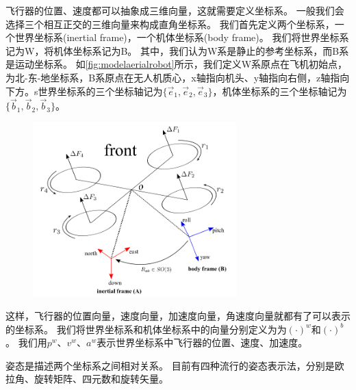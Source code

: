 \documentclass[
  type=master
]{gdutthesis}
\begin{document}
飞行器的位置、速度都可以抽象成三维向量，这就需要定义坐标系。
一般我们会选择三个相互正交的三维向量来构成直角坐标系。
我们首先定义两个坐标系，一个世界坐标系(inertial frame)，一个机体坐标系(body frame)。
我们将世界坐标系记为W，将机体坐标系记为B。
其中，我们认为W系是静止的参考坐标系，而B系是运动坐标系。
如\autoref{fig:modelaerialrobot}所示，我们定义W系原点在飞机初始点，为北-东-地坐标系，B系原点在无人机质心，x轴指向机头、y轴指向右侧，z轴指向下方。s世界坐标系的三个坐标轴记为$\big\{ \vec{e}_1,\vec{e}_2,\vec{e}_3 \big\}$，机体坐标系的三个坐标轴记为$\big\{ \vec{b}_1,\vec{b}_2,\vec{b}_3 \big\}$。
\begin{figure}[htbp]
	\centering
	\includegraphics[width=0.7\textwidth]{屏幕截图 2022-03-31 222546.png}
	\label{fig:modelaerialrobot}
\end{figure}
这样，飞行器的位置向量，速度向量，加速度向量，角速度向量就都有了可以表示的坐标系。
我们将世界坐标系和机体坐标系中的向量分别定义为为$(\cdot)^w$和$(\cdot)^b$。
我们用$p^w$、$v^w$、$a^w$表示世界坐标系中飞行器的位置、速度、加速度。

姿态是描述两个坐标系之间相对关系。
目前有四种流行的姿态表示法，分别是欧拉角、旋转矩阵、四元数和旋转矢量\cite{shuster1993survey}。
\end{document}
